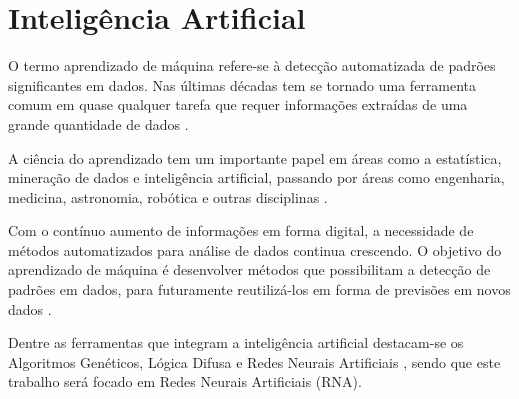 \section{Inteligência Artificial}

O termo aprendizado de máquina refere-se à detecção automatizada de padrões significantes em dados. Nas últimas décadas tem se tornado uma ferramenta comum em quase qualquer tarefa que requer informações extraídas de uma grande quantidade de dados \cite{uml}.

A ciência do aprendizado tem um importante papel em áreas como a estatística, mineração de dados e inteligência artificial, passando por áreas como engenharia, medicina, astronomia, robótica e outras disciplinas \cite{statistical-learning}.

Com o contínuo aumento de informações em forma digital, a necessidade de métodos automatizados para análise de dados continua crescendo. O objetivo do aprendizado de máquina é desenvolver métodos que possibilitam a detecção de padrões em dados, para futuramente reutilizá-los em forma de previsões em novos dados \cite{mlpp}. 

Dentre as ferramentas que integram a inteligência artificial destacam-se os Algoritmos Genéticos, Lógica Difusa e Redes Neurais Artificiais \cite{ai-fili}, sendo que este trabalho será focado em Redes Neurais Artificiais (RNA).